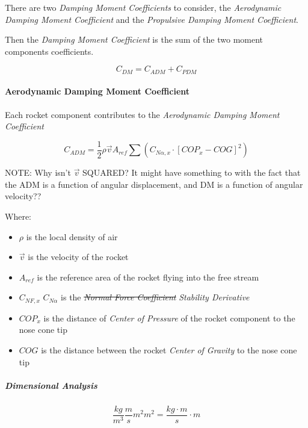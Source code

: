 \documentclass[]{article}
\providecommand{\tightlist}{%
  \setlength{\itemsep}{0pt}\setlength{\parskip}{0pt}}
\let\oldparagraph\paragraph
\renewcommand{\paragraph}[1]{\oldparagraph{#1}\mbox{}}
\let\oldsubparagraph\subparagraph
\renewcommand{\subparagraph}[1]{\oldsubparagraph{#1}\mbox{}}
\begin{document}
There are two \emph{Damping Moment Coefficients} to consider, the
\emph{Aerodynamic Damping Moment Coefficient} and the \emph{Propulsive
Damping Moment Coefficient}.

Then the \emph{Damping Moment Coefficient} is the sum of the two moment
components coefficients.

\begin{equation}
\label{eq_coef_moment_damping}
C_{DM} = C_{ADM} + C_{PDM}
\end{equation}

\paragraph{Aerodynamic Damping Moment
Coefficient}\label{aerodynamic-damping-moment-coefficient}

Each rocket component contributes to the \emph{Aerodynamic Damping
Moment Coefficient}

\begin{equation}
\label{eq_coef_moment_damping_aero}
C_{ADM} = \dfrac{1}{2} \rho \vec{v} A_{ref} \sum \left( C_{N \alpha,x} \cdot \left[ COP_{x} - COG \right]^2  \right) 
\end{equation}

NOTE: Why isn't \(\vec{v}\) SQUARED? It might have something to with the
fact that the ADM is a function of angular displacement, and DM is a
function of angular velocity??

Where:

\begin{itemize}
\tightlist
\item
  \(\rho\) is the local density of air
\item
  \(\vec{v}\) is the velocity of the rocket
\item
  \(A_{ref}\) is the reference area of the rocket flying into the free
  stream
\item
  \sout{\(C_{NF,x}\)} \(C_{N \alpha}\) is the \sout{\emph{Normal Force
  Coefficient}} \emph{Stability Derivative}
\item
  \(COP_{x}\) is the distance of \emph{Center of Pressure} of the rocket
  component to the nose cone tip
\item
  \(COG\) is the distance between the rocket \emph{Center of Gravity} to
  the nose cone tip
\end{itemize}

\subparagraph{Dimensional Analysis}\label{dimensional-analysis-1}

\begin{equation}
\label{eq_c2a_dim_anal}
\dfrac{kg}{m^3} \dfrac{m}{s} m^2 m^2 = \dfrac{kg \cdot m }{s} \cdot m 
\end{equation}
\end{document}
